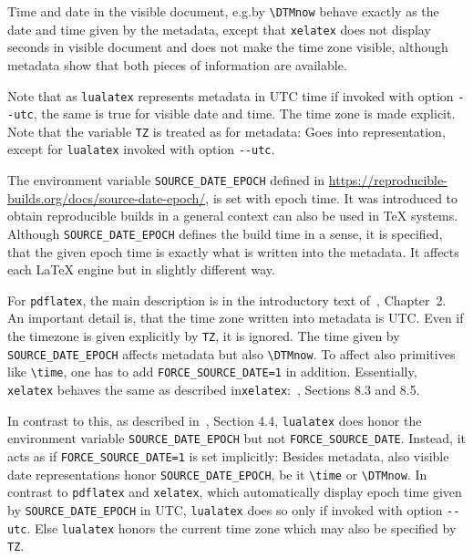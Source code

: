 \documentclass[a4paper]{article}%
\newcommand{\pdflatex}{\texttt{pdflatex}}
\newcommand{\lualatex}{\texttt{lualatex}}
\newcommand{\xelatex}{\texttt{xelatex}}
\newcommand{\cmd}[1]{\texttt{\textbackslash#1}}
\begin{document}
Time and date in the visible document, e.g.\@ by \cmd{DTMnow} 
behave exactly as the date and time given by the metadata, 
except that \xelatex{} does not display seconds in visible document 
and does not make the time zone visible, 
although metadata show that both pieces of information are available. 

Note that as \lualatex{} represents metadata in UTC time if invoked with option \texttt{-{}-utc}, 
the same is true for visible date and time. 
The time zone is made explicit. 
Note that the variable \texttt{TZ} is treated as for metadata: 
Goes into representation, except for \lualatex{} invoked with option \texttt{-{}-utc}. 
\medskip








The environment variable \texttt{SOURCE\_DATE\_EPOCH} 
defined in \url{https://reproducible-builds.org/docs/source-date-epoch/}, 
is set with epoch time. 
It was introduced to obtain reproducible builds in a general context 
can also be used in \TeX{} systems. 
Although \texttt{SOURCE\_DATE\_EPOCH} defines the build time in a sense, 
it is specified, that the given epoch time is exactly what is written into the metadata. 
It affects each \LaTeX{} engine but in slightly different way. 

For \pdflatex, the main description is in the introductory text of~\cite{PdfTexUsr25}, Chapter~2.
An important detail is, that the time zone written into metadata is UTC\@. 
Even if the timezone is given explicitly by \texttt{TZ}, it is ignored. 
The time given by \texttt{SOURCE\_DATE\_EPOCH} affects metadata but also \cmd{DTMnow}. 
To affect also primitives like \cmd{time}, 
one has to add \texttt{FORCE\_SOURCE\_DATE=1} in addition. 
Essentially, \xelatex{} behaves the same as described in\xelatex:~\cite{XeTexRef25}, Sections 8.3 and 8.5. 

In contrast to this, as described in~\cite{LuaTexRef25}, Section 4.4, 
\lualatex{} does honor the environment variable \texttt{SOURCE\_DATE\_EPOCH} but not \texttt{FORCE\_SOURCE\_DATE}. 
Instead, it acts as if \texttt{FORCE\_SOURCE\_DATE=1} is set implicitly: 
Besides metadata, also visible date representations honor \texttt{SOURCE\_DATE\_EPOCH}, 
be it \cmd{time} or \cmd{DTMnow}. 
In contrast to \pdflatex{} and \xelatex, 
which automatically display epoch time given by \texttt{SOURCE\_DATE\_EPOCH} in UTC, 
\lualatex{} does so only if invoked with option \texttt{-{}-utc}. 
Else \lualatex{} honors the current time zone 
which may also be specified by \texttt{TZ}. 
\end{document}
